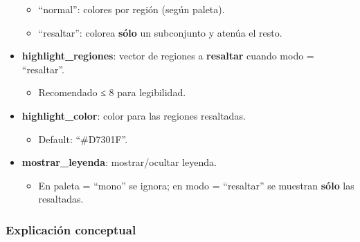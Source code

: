 \documentclass[
  11pt,
  letterpaper,
  DIV=11,
  numbers=noendperiod]{scrartcl}
\providecommand{\tightlist}{%
  \setlength{\itemsep}{0pt}\setlength{\parskip}{0pt}}\usepackage{longtable,booktabs,array}
\begin{document}
\begin{itemize}
  \begin{itemize}
  \item
    ``normal'': colores por región (según paleta).
  \item
    ``resaltar'': colorea \textbf{sólo} un subconjunto y atenúa el
    resto.
  \end{itemize}
\item
  \textbf{highlight\_regiones}: vector de regiones a \textbf{resaltar}
  cuando modo = ``resaltar''.

  \begin{itemize}
  \tightlist
  \item
    Recomendado ≤ 8 para legibilidad.
  \end{itemize}
\item
  \textbf{highlight\_color}: color para las regiones resaltadas.

  \begin{itemize}
  \tightlist
  \item
    Default: ``\#D7301F''.
  \end{itemize}
\item
  \textbf{mostrar\_leyenda}: mostrar/ocultar leyenda.

  \begin{itemize}
  \tightlist
  \item
    En paleta = ``mono'' se ignora; en modo = ``resaltar'' se muestran
    \textbf{sólo} las resaltadas.
  \end{itemize}
\end{itemize}

\subsubsection{\texorpdfstring{\textbf{Explicación
conceptual}}{Explicación conceptual}}\label{explicaciuxf3n-conceptual-21}
\end{document}

